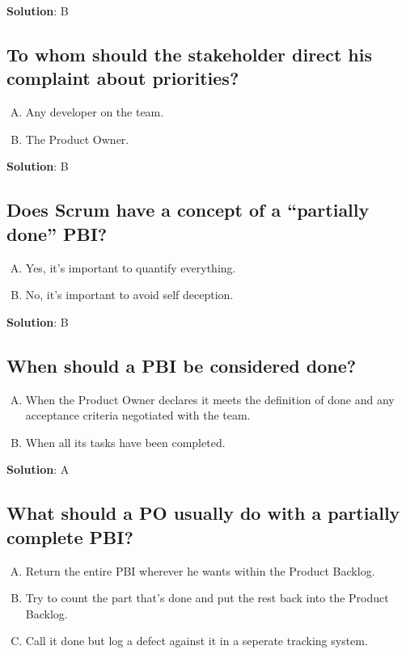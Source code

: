 \textbf{Solution}: B


\subsection{To whom should the stakeholder direct his complaint about priorities?}
\begin{enumerate}[A)]
  \item Any developer on the team.
  \item The Product Owner.
\end{enumerate}


\textbf{Solution}: B


\subsection{Does Scrum have a concept of a \enquote{partially done} PBI?}
\begin{enumerate}[A)]
  \item Yes, it's important to quantify everything.
  \item No, it's important to avoid self deception.
\end{enumerate}


\textbf{Solution}: B


\subsection{When should a PBI be considered done?}
\begin{enumerate}[A)]
  \item When the Product Owner declares it meets the definition of done and any acceptance criteria negotiated with the team.
  \item When all its tasks have been completed.
\end{enumerate}


\textbf{Solution}: A


\subsection{What should a PO usually do with a partially complete PBI?}
\begin{enumerate}[A)]
  \item Return the entire PBI wherever he wants within the Product Backlog.
  \item Try to count the part that's done and put the rest back into the Product Backlog.
  \item Call it done but log a defect against it in a seperate tracking system.
\end{enumerate}


